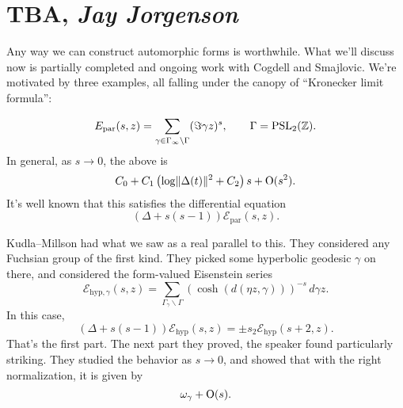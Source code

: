 \documentclass[reqno]{amsart} 
\begin{document}
\section{TBA, \textnormal{\emph{Jay Jorgenson}}}

Any way we can construct automorphic forms is worthwhile.  What we'll discuss now is partially completed and ongoing work with Cogdell and Smajlovic.  We're motivated by three examples, all falling under the canopy of ``Kronecker limit formula'':
\begin{example}
  \begin{equation*}
    E_{\mathrm{par}}(s, z) = \sum_{\gamma \in \Gamma_\infty \backslash \Gamma}
    (\Im \gamma z)^s, \qquad \Gamma = \operatorname{PSL}_2(\mathbb{Z}).
  \end{equation*}
  In general, as $s \rightarrow 0$, the above is
  \begin{equation*}
    C_0 +
    C_1
    \left(
      \log \lVert \Delta(t) \rVert^2
      + C_2\right) s
    + \operatorname{O}(s^2).
  \end{equation*}
  It's well known that this satisfies the differential equation
  \begin{equation*}
    \left( \Delta + s(s - 1) \right) \mathcal{E}_{\mathrm{par}}(s, z).
  \end{equation*}
\end{example}
\begin{example}
  Kudla--Millson had what we saw as a real parallel to this.  They considered any Fuchsian group of the first kind.  They picked some hyperbolic geodesic $\gamma$ on there, and considered the form-valued Eisenstein series
  \begin{equation*}
    \mathcal{E}_{\mathrm{hyp}, \gamma}
    (s,z)
    = \sum_{\Gamma_\gamma \backslash \Gamma}
    \left( \cosh(d(\eta z, \gamma)) \right)^{- s}
    \, d \gamma z.
  \end{equation*}
  In this case,
  \begin{equation*}
    \left( \Delta + s(s - 1) \right) \mathcal{E}_{\mathrm{hyp}}(s, z)
    = \pm s_2 \mathcal{E}_{\mathrm{hyp}}(s + 2, z).
  \end{equation*}
  That's the first part.  The next part they proved, the speaker found particularly striking.  They studied the behavior as $s \rightarrow 0$, and showed that with the right normalization, it is given by
  \begin{equation*}
    \omega_\gamma + \operatorname{O}(s).
  \end{equation*}
\end{example}
\end{document}
